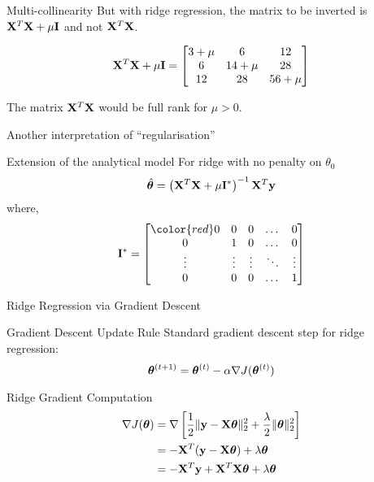 \documentclass{beamer}
\begin{document}
\begin{frame}{Multi-collinearity}
But with ridge regression, the matrix to be inverted is $\mathbf{X}^{T}\mathbf{X} + \mu \mathbf{I}$ and not $\mathbf{X}^{T}\mathbf{X}$.

\begin{equation*}
\mathbf{X}^T\mathbf{X} + \mu \mathbf{I} = \begin{bmatrix}
3+\mu & 6& 12\\
6 & 14+\mu & 28\\
12 & 28& 56+\mu \\
\end{bmatrix}
\end{equation*}

The matrix $\mathbf{X}^T\mathbf{X}$ would be full rank for $\mu>0$. 

\pause Another interpretation of ``regularisation''
\end{frame}


\begin{frame}{Extension of the analytical model}
For ridge with no penalty on $\theta_0$
$$
\hat{\boldsymbol{\theta}} = \left(\mathbf{X}^T\mathbf{X}+\mu \mathbf{I}^*\right)^{-1}\mathbf{X}^T\mathbf{y}
$$
where, $$\mI^* = \begin{bmatrix}
    \color{red}0 & 0 & 0 & \dots  & 0 \\
    0 & 1& 0 & \dots  & 0\\
    \vdots & \vdots & \vdots & \ddots & \vdots \\
    0 & 0 & 0 & \dots  & 1
\end{bmatrix}$$
\end{frame}



\begin{frame}{Ridge Regression via Gradient Descent}
\begin{theorembox}{Gradient Descent Update Rule}
Standard gradient descent step for ridge regression:
$$\boldsymbol{\theta}^{(t+1)} = \boldsymbol{\theta}^{(t)} - \alpha \nabla J(\boldsymbol{\theta}^{(t)})$$
\end{theorembox}
\pause

\begin{codebox}{Ridge Gradient Computation}
\begin{align}
\nabla J(\boldsymbol{\theta}) &= \nabla \left[\frac{1}{2}\|\mathbf{y}-\mathbf{X}\boldsymbol{\theta}\|_2^2 + \frac{\lambda}{2}\|\boldsymbol{\theta}\|_2^2\right] \\
&= -\mathbf{X}^T(\mathbf{y}-\mathbf{X}\boldsymbol{\theta}) + \lambda\boldsymbol{\theta} \\
&= -\mathbf{X}^T\mathbf{y} + \mathbf{X}^T\mathbf{X}\boldsymbol{\theta} + \lambda\boldsymbol{\theta}
\end{align}
\end{codebox}
\end{frame}
\end{document}
